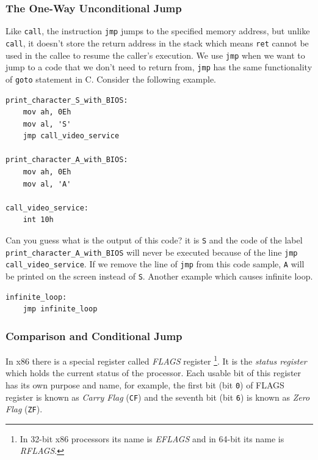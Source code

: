 \subsubsection{The One-Way Unconditional
Jump}\label{the-one-way-unconditional-jump}

Like \lstinline!call!, the instruction \lstinline!jmp! jumps to the
specified memory address, but unlike \lstinline!call!, it doesn't store
the return address in the stack which means \lstinline!ret! cannot be
used in the callee to resume the caller's execution. We use
\lstinline!jmp! when we want to jump to a code that we don't need to
return from, \lstinline!jmp! has the same functionality of
\lstinline!goto! statement in C. Consider the following example.

\begin{lstlisting}
print_character_S_with_BIOS:
    mov ah, 0Eh
    mov al, 'S'
    jmp call_video_service

print_character_A_with_BIOS:
    mov ah, 0Eh
    mov al, 'A'

call_video_service:
    int 10h
\end{lstlisting}

Can you guess what is the output of this code? it is \lstinline!S! and
the code of the label \lstinline!print_character_A_with_BIOS! will never
be executed because of the line \lstinline!jmp call_video_service!. If
we remove the line of \lstinline!jmp! from this code sample,
\lstinline!A! will be printed on the screen instead of \lstinline!S!.
Another example which causes infinite loop.

\begin{lstlisting}
infinite_loop:
    jmp infinite_loop
\end{lstlisting}

\subsubsection{Comparison and Conditional
Jump}\label{comparison-and-conditional-jump}

In x86 there is a special register called \emph{FLAGS} register
\footnote{In 32-bit x86 processors its name is \emph{EFLAGS} and in
  64-bit its name is \emph{RFLAGS}.}. It is the \emph{status register}
which holds the current status of the processor. Each usable bit of this
register has its own purpose and name, for example, the first bit (bit
\lstinline!0!) of FLAGS register is known as \emph{Carry Flag}
(\lstinline!CF!) and the seventh bit (bit \lstinline!6!) is known as
\emph{Zero Flag} (\lstinline!ZF!).

